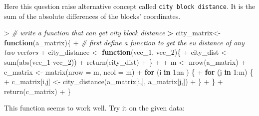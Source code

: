 \documentclass[
]{article}
\newenvironment{Shaded}{\begin{snugshade}}{\end{snugshade}}
\newcommand{\AttributeTok}[1]{\textcolor[rgb]{0.77,0.63,0.00}{#1}}
\newcommand{\CommentTok}[1]{\textcolor[rgb]{0.56,0.35,0.01}{\textit{#1}}}
\newcommand{\ControlFlowTok}[1]{\textcolor[rgb]{0.13,0.29,0.53}{\textbf{#1}}}
\newcommand{\DecValTok}[1]{\textcolor[rgb]{0.00,0.00,0.81}{#1}}
\newcommand{\ErrorTok}[1]{\textcolor[rgb]{0.64,0.00,0.00}{\textbf{#1}}}
\newcommand{\FunctionTok}[1]{\textcolor[rgb]{0.00,0.00,0.00}{#1}}
\newcommand{\NormalTok}[1]{#1}
\newcommand{\OtherTok}[1]{\textcolor[rgb]{0.56,0.35,0.01}{#1}}
\newcommand{\SpecialCharTok}[1]{\textcolor[rgb]{0.00,0.00,0.00}{#1}}
\begin{document}
Here this question raise alternative concept called
\texttt{city\ block\ distance}. It is the sum of the absolute
differences of the blocks' coordinates.

\begin{Shaded}
\begin{Highlighting}[]
\SpecialCharTok{\textgreater{}} \CommentTok{\# write a function that can get city block distance}
\ErrorTok{\textgreater{}}\NormalTok{ city\_matrix}\OtherTok{\textless{}{-}}\ControlFlowTok{function}\NormalTok{(a\_matrix)\{}
\SpecialCharTok{+}   \CommentTok{\# first define a function to get the eu distance of any two vectors}
\SpecialCharTok{+}\NormalTok{   city\_distance }\OtherTok{\textless{}{-}} \ControlFlowTok{function}\NormalTok{(vec\_1, vec\_2)\{}
\SpecialCharTok{+}\NormalTok{     city\_dist }\OtherTok{\textless{}{-}} \FunctionTok{sum}\NormalTok{(}\FunctionTok{abs}\NormalTok{(vec\_1}\SpecialCharTok{{-}}\NormalTok{vec\_2))}
\SpecialCharTok{+}     \FunctionTok{return}\NormalTok{(city\_dist)}
\SpecialCharTok{+}\NormalTok{     \}}
\SpecialCharTok{+}   
\SpecialCharTok{+}\NormalTok{   m }\OtherTok{\textless{}{-}} \FunctionTok{nrow}\NormalTok{(a\_matrix)}
\SpecialCharTok{+}\NormalTok{   c\_matrix }\OtherTok{\textless{}{-}} \FunctionTok{matrix}\NormalTok{(}\AttributeTok{nrow =}\NormalTok{ m, }\AttributeTok{ncol =}\NormalTok{ m)}
\SpecialCharTok{+}   \ControlFlowTok{for}\NormalTok{ (i }\ControlFlowTok{in} \DecValTok{1}\SpecialCharTok{:}\NormalTok{m ) \{}
\SpecialCharTok{+}     \ControlFlowTok{for}\NormalTok{ (j }\ControlFlowTok{in} \DecValTok{1}\SpecialCharTok{:}\NormalTok{m) \{}
\SpecialCharTok{+}\NormalTok{       c\_matrix[i,j] }\OtherTok{\textless{}{-}} \FunctionTok{city\_distance}\NormalTok{(a\_matrix[i,], a\_matrix[j,])}
\SpecialCharTok{+}\NormalTok{     \}}
\SpecialCharTok{+}\NormalTok{   \}}
\SpecialCharTok{+}   \FunctionTok{return}\NormalTok{(c\_matrix)}
\SpecialCharTok{+}\NormalTok{ \}}
\end{Highlighting}
\end{Shaded}

This function seems to work well. Try it on the given data:
\end{document}
